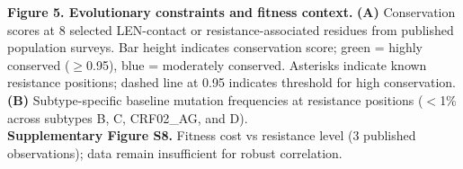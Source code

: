 \documentclass[12pt,a4paper]{article}
\begin{document}
\textbf{Figure 5. Evolutionary constraints and fitness context.}
\textbf{(A)} Conservation scores at 8 selected LEN-contact or resistance-associated residues from published population surveys. Bar height indicates conservation score; green = highly conserved ($\geq$0.95), blue = moderately conserved. Asterisks indicate known resistance positions; dashed line at 0.95 indicates threshold for high conservation.\\
\textbf{(B)} Subtype-specific baseline mutation frequencies at resistance positions ($<$1\% across subtypes B, C, CRF02\_AG, and D).\\
\textbf{Supplementary Figure S8.} Fitness cost vs resistance level (3 published observations); data remain insufficient for robust correlation.
\end{document}
